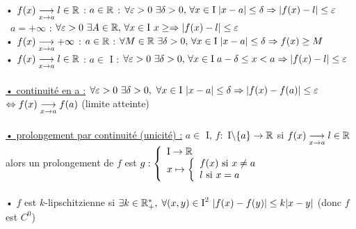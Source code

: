 \documentclass[12 pt]{book}
\begin{document}
\begin{flushleft}
\begin{doublespace}

	• $f(x) \underset{x \rightarrow a}{\longrightarrow} l\in\mathbb{R}$ : $a\in\mathbb{R}$ : $\forall \varepsilon > 0 \ \exists \delta > 0, \, \forall x\in \text{I} \; |x - a|\leq \delta \Rightarrow |f(x) - l| \leq \varepsilon$\\
	\qquad \qquad \qquad \qquad \ $a = + \infty$ : $\forall \varepsilon > 0 \ \exists A\in \mathbb{R}, \, \forall x\in \text{I} \ x\geq \Rightarrow |f(x) - l|\leq \varepsilon$\\
	• $f(x) \underset{x \rightarrow a}{\longrightarrow} +\infty$ : $a\in\mathbb{R}$ : $\forall M\in\mathbb{R} \ \exists \delta > 0, \, \forall x\in \text{I} \; |x - a|\leq \delta \Rightarrow f(x)\geq M$\\
	• $f(x) \underset{x \rightarrow a}{\longrightarrow} l\in\mathbb{R}$ : $a\in$ I : $\forall \varepsilon > 0 \ \exists \delta > 0, \, \forall x\in \text{I} \; a-\delta \leq x < a \Rightarrow |f(x) - l| \leq \varepsilon$\\
	
	\text{ }\\
	\underline{• continuité en a :} $\forall \varepsilon >0 \ \exists \delta > 0, \ \forall x\in \text{I} \ |x - a|\leq \delta \Rightarrow |f(x) - f(a)| \leq \varepsilon$\\
	\qquad \qquad \qquad \qquad $\Leftrightarrow f(x) \underset{x \rightarrow a}{\longrightarrow} f(a)$ (limite atteinte)\\
	
	\text{ }\\
	\underline{• prolongement par continuité (unicité) :} $a\in$ I, $f :$ I$\backslash\{a\} \rightarrow \mathbb{R}$ si $f(x) \underset{x \rightarrow a}{\longrightarrow} l\in \mathbb{R}$\\
	alors un prolongement de $f$ est $g : \left\{\begin{array}{ll} \text{I} \ra \R \\ x \mapsto \left\{\begin{array}{ll} f(x) \ \text{si } x\ne a \\ l \ \text{si } x=a \end{array} \right.  \end{array} \right.$\\
	
	\text{ }\\
	• $f$ est $k$-lipschitzienne si $\exists k\in \mathbb{R}_+^*, \; \forall (x,y)\in \text{I}^2 \ |f(x) - f(y)| \leq k|x - y|$  (donc $f$ est $C^0$)\\
	
\end{doublespace}
\end{flushleft}
\end{document}
